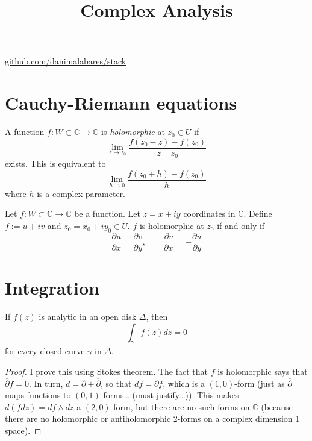 



\title{Complex Analysis}
\maketitle

\label{section-phantom}
\hfill
\href{http://github.com/danimalabares/stack}{github.com/danimalabares/stack}

\tableofcontents

\section{Cauchy-Riemann equations}
\label{section-Cauchy-Riemann-equations}

\begin{definition}
\label{definition-holomorphic-function}
A function $f:W\subset \mathbb{C} \to \mathbb{C}$ is {\it holomorphic} at $z_0
\in U$ if
$$
\lim_{z\to z_0} \frac{f(z_0-z)-f(z_0)}{z-z_0}
$$
exists. This is equivalent to
$$
\lim_{h\to 0} \frac{f(z_0+h)-f(z_0)}{h}
$$
where $h$ is a complex parameter.
\end{definition}

\begin{theorem}
\label{theorem-Cauchy-Riemann}
Let $f:W\subset\mathbb{C}\to \mathbb{C}$ be a function. Let $z=x+iy$ coordinates
in $\mathbb{C}$. Define $f:=u+iv$ and
$z_0=x_0+iy_0 \in U$. $f$ is holomorphic at $z_0$ if and only if
$$
\frac{\partial u}{\partial x}=\frac{\partial v}{\partial y},\qquad \frac{\partial v}{\partial x}=-\frac{\partial u}{\partial y}
$$
\end{theorem}

\section{Integration}
\label{section-integration}

\begin{theorem}[Cauchy]
\label{theorem-Cauchy}
If $f(z)$ is analytic in an open disk $\Delta$, then
\begin{equation}
\label{equation-Cauchy-theorem}
\int_\gamma f(z)dz=0
\end{equation}
for every closed curve $\gamma$ in $\Delta$.
\end{theorem}

\begin{proof}
I prove this using Stokes theorem. The fact that $f$ is holomorphic says that
$\overline{\partial}f=0$. In turn, $d=\partial+\overline{\partial}$, so that
$df=\partial f$, which is a $(1,0)$-form (just as $\overline{\partial}$ maps
functions to $(0,1)$-forms… (must justify…)). This makes $d(fdz)=df\wedge dz$ a
$(2,0)$-form, but there are no such forms on $\mathbb{C}$ (because there are no
holomorphic or antiholomorphic 2-forms on a complex dimension 1 space).
\end{proof}

